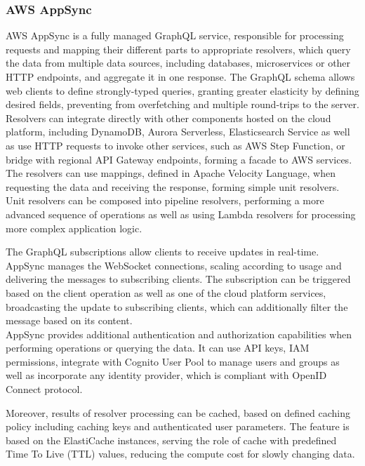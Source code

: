 \subsubsection{AWS AppSync}

AWS AppSync \cite{AppSync} is a fully managed GraphQL service, responsible for processing requests and mapping their different parts to appropriate resolvers, which query the data from multiple data sources, including databases, microservices or other HTTP endpoints, and aggregate it in one response.
The GraphQL schema allows web clients to define strongly-typed queries, granting greater elasticity by defining desired fields, preventing from overfetching and multiple round-trips to the server. \\

Resolvers can integrate directly with other components hosted on the cloud platform, including DynamoDB, Aurora Serverless, Elasticsearch Service as well as use HTTP requests to invoke other services, such as AWS Step Function, or bridge with regional API Gateway endpoints, forming a facade to AWS services.
The resolvers can use mappings, defined in Apache Velocity Language, when requesting the data and receiving the response, forming simple unit resolvers.
Unit resolvers can be composed into pipeline resolvers, performing a more advanced sequence of operations as well as using Lambda resolvers for processing more complex application logic.

The GraphQL subscriptions allow clients to receive updates in real-time. AppSync manages the WebSocket connections, scaling according to usage and delivering the messages to subscribing clients.
The subscription can be triggered based on the client operation as well as one of the cloud platform services, broadcasting the update to subscribing clients, which can additionally filter the message based on its content. \\

AppSync provides additional authentication and authorization capabilities when performing operations or querying the data.
It can use API keys, IAM permissions, integrate with Cognito User Pool to manage users and groups as well as incorporate any identity provider, which is compliant with OpenID Connect protocol.

Moreover, results of resolver processing can be cached, based on defined caching policy including caching keys and authenticated user parameters.
The feature is based on the ElastiCache instances, serving the role of cache with predefined Time To Live (TTL) values, reducing the compute cost for slowly changing data.

